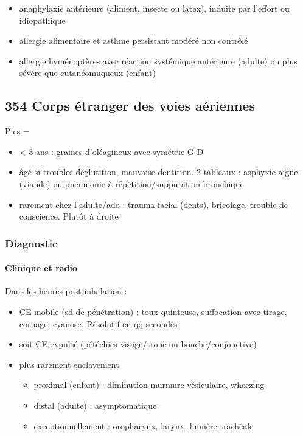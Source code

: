 \documentclass[11pt]{article}
\begin{document}
\begin{itemize}
\item anaphylaxie antérieure (aliment, insecte ou latex), induite par l'effort
ou idiopathique
\item allergie alimentaire et asthme persistant modéré non contrôlé
\item allergie hyménoptères avec réaction systémique antérieure (adulte) ou
plus sévère que cutanéomuqueux (enfant)
\end{itemize}

\subsection{354 \textdagger{} Corps étranger des voies aériennes}
\label{sec:orge260f88}
\label{sec:354_corps_etranger_des_voies_aeriennes}

Pics = 

\begin{itemize}
\item < 3 ans : graines d'oléagineux avec symétrie G-D
\item âgé si troubles déglutition, mauvaise dentition. 2 tableaux : asphyxie
aigüe (viande) ou pneumonie à répétition/suppuration bronchique
\item rarement chez l'adulte/ado : trauma facial (dents), bricolage, trouble
de conscience. Plutôt à droite
\end{itemize}


\subsubsection{Diagnostic}
\label{sec:orgc517a6d}
\paragraph{Clinique et radio}
\label{sec:org27214f0}
Dans les heures post-inhalation :

\begin{itemize}
\item CE mobile (sd de pénétration) : toux quinteuse, suffocation avec tirage,
cornage, cyanose. Résolutif en qq secondes
\item soit CE expulsé (pétéchies visage/tronc ou bouche/conjonctive)
\item plus rarement enclavement 

\begin{itemize}
\item proximal (enfant) : diminution murmure vésiculaire, wheezing
\item distal (adulte) : asymptomatique
\item exceptionnellement : oropharynx, larynx, lumière trachéale
\end{itemize}
\end{itemize}
\end{document}
